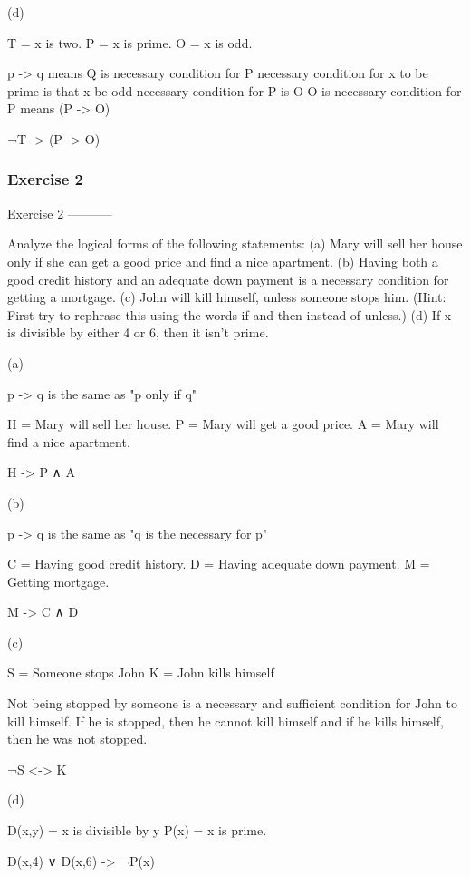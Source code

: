 (d)

T = x is two.
P = x is prime.
O = x is odd.

p -> q means Q is necessary condition for P
necessary condition for x to be prime is that x be odd
necessary condition for P is O
O is necessary condition for P means (P -> O)

    ¬T -> (P -> O)

\subsubsection{Exercise 2}
Exercise 2
-----------

    Analyze the logical forms of the following statements:
    (a) Mary will sell her house only if she can get a good price and find a
    nice apartment.
    (b) Having both a good credit history and an adequate down payment is a
    necessary condition for getting a mortgage.
    (c) John will kill himself, unless someone stops him. (Hint: First try to
    rephrase this using the words if and then instead of unless.)
    (d) If x is divisible by either 4 or 6, then it isn’t prime.

(a)

p -> q is the same as "p only if q"

H = Mary will sell her house.
P = Mary will get a good price.
A = Mary will find a nice apartment.

    H -> P ∧ A

(b)

p -> q is the same as "q is the necessary for p"

C = Having good credit history.
D = Having adequate down payment.
M = Getting mortgage.

    M -> C ∧ D

(c)

S = Someone stops John
K = John kills himself

Not being stopped by someone is a necessary and sufficient condition
for John to kill himself. If he is stopped, then he cannot kill
himself and if he kills himself, then he was not stopped.

    ¬S <-> K

(d)

D(x,y) = x is divisible by y
P(x) = x is prime.

    D(x,4) ∨ D(x,6) -> ¬P(x)

